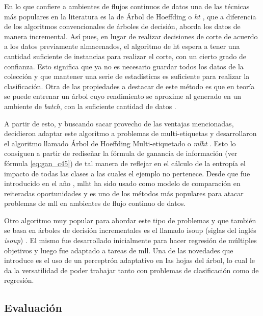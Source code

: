 En lo que confiere a ambientes de flujos continuos de datos una de las técnicas
más populares en la literatura es la de Árbol de Hoeffding o
\textit{\acrfull{ht}} \cite{domingos_mining_2002}, que a diferencia de los
algoritmos convencionales de árboles de decisión, aborda los datos de manera
incremental. Así pues, en lugar de realizar decisiones de corte de acuerdo a los
datos previamente almacenados, el algoritmo de \acrshort{ht} espera a tener una
cantidad suficiente de instancias para realizar el corte, con un cierto grado de
confianza. Esto significa que ya no es necesario guardar todos los datos de la
colección y que mantener una serie de estadísticas es suficiente para realizar
la clasificación. Otra de las propiedades a destacar de este método es que en
teoría se puede entrenar un árbol cuyo rendimiento se aproxime al generado en un
ambiente de \textit{batch}, con la suficiente cantidad de datos
\cite{bifet_machine_2018}.

A partir de esto, y buscando sacar provecho de las ventajas mencionadas,
\citeauthor{read_scalable_2012} decidieron adaptar este algoritmo a problemas de
multi-etiquetas y desarrollaron el algoritmo llamado Árbol de Hoeffding
Multi-etiquetado o \textit{\acrfull{mlht}} \cite{read_scalable_2012}. Esto lo
consiguen a partir de rediseñar la fórmula de ganancia de información (ver
fórmula \ref{eq:gan_c45}) de tal manera de reflejar en el cálculo de la entropía
el impacto de todas las clases a las cuales el ejemplo no pertenece. Desde que
fue introducido en el año \citeyear{read_scalable_2012}, \acrshort{mlht} ha sido
usado como modelo de comparación en reiteradas oportunidades
\cite{sousa_multi-label_2018} y es uno de los métodos más populares para atacar
problemas de \acrshort{mll} en ambientes de flujo continuo de datos.

Otro algoritmo muy popular para abordar este tipo de problemas y que también se
basa en árboles de decisión incrementales es el llamado \acrshort{isoup} (siglas
del inglés \textit{\acrlong{isoup}}) \cite{osojnik_multi-label_2017}. El mismo
fue desarrollado inicialmente para hacer regresión de múltiples objetivos y
luego fue adaptado a tareas de \acrshort{mll}. Una de las novedades que
introduce es el uso de un perceptrón adaptativo en las hojas del árbol, lo cual
le da la versatilidad de poder trabajar tanto con problemas de clasificación
como de regresión.


\subsection{Evaluación}
\label{mll_evaluacion}

